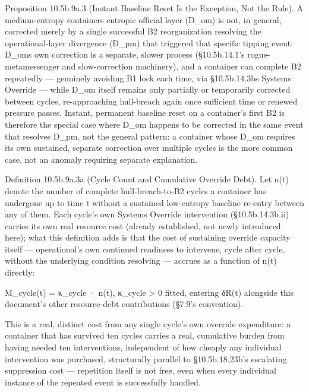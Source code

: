 \documentclass[
]{article}
\begin{document}
Proposition 10.5b.9a.3 (Instant Baseline Reset Is the Exception, Not the
Rule). A medium-entropy containers entropic official layer (D\_om) is
not, in general, corrected merely by a single successful B2
reorganization resolving the operational-layer divergence (D\_pm) that
triggered that specific tipping event: D\_oms own correction is a
separate, slower process (§10.5b.14.1's rogue-metamessenger and
slow-correction machinery), and a container can complete B2 repeatedly
--- genuinely avoiding B1 lock each time, via §10.5b.14.3bs Systems
Override --- while D\_om itself remains only partially or temporarily
corrected between cycles, re-approaching hull-breach again once
sufficient time or renewed pressure passes. Instant, permanent baseline
reset on a container's first B2 is therefore the special case where D\_om
happens to be corrected in the same event that resolves D\_pm, not the
general pattern: a container whose D\_om requires its own sustained,
separate correction over multiple cycles is the more common case, not an
anomaly requiring separate explanation.

Definition 10.5b.9a.3a (Cycle Count and Cumulative Override Debt). Let
n(t) denote the number of complete hull-breach-to-B2 cycles a container
has undergone up to time t without a sustained low-entropy baseline
re-entry between any of them. Each cycle's own Systems Override
intervention (§10.5b.14.3b.ii) carries its own real resource cost
(already established, not newly introduced here); what this definition
adds is that the cost of sustaining override capacity itself ---
operational's own continued readiness to intervene, cycle after cycle,
without the underlying condition resolving --- accrues as a function of
n(t) directly:

M\_cycle(t) = κ\_cycle · n(t), κ\_cycle \textgreater{} 0 fitted,
entering δR(t) alongside this document's other resource-debt
contributions (§7.9's convention).

This is a real, distinct cost from any single cycle's own override
expenditure: a container that has survived ten cycles carries a real,
cumulative burden from having needed ten interventions, independent of
how cheaply any individual intervention was purchased, structurally
parallel to §10.5b.18.23b's escalating suppression cost --- repetition
itself is not free, even when every individual instance of the repeated
event is successfully handled.
\end{document}
